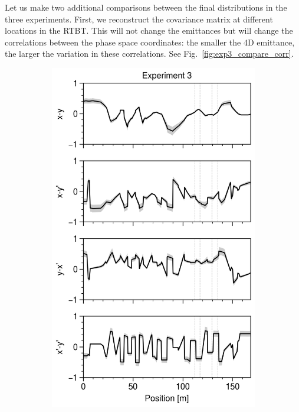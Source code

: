 Let us make two additional comparisons between the final distributions in the three experiments. First, we reconstruct the covariance matrix at different locations in the RTBT. This will not change the emittances but will change the correlations between the phase space coordinates: the smaller the 4D emittance, the larger the variation in these correlations. See Fig.~\ref{fig:exp3_compare_corr}.
%
\begin{figure}[!p]
    \centering
    \vspace*{3.0cm}
    \begin{subfigure}{0.32\textwidth}
        \includegraphics[width=\textwidth]{Images/chapter5/exp3/compare_corr.png}

\end{subfigure}
\end{figure}
